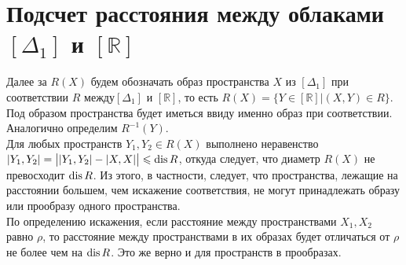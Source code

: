 
\section{Подсчет расстояния между облаками $[\Delta_1]$ и $[\mathbb{R}]$}
Далее за $R(X)$ будем обозначать образ пространства $X$ из $[\Delta_1]$ при соответствии $R$ между$[\Delta_1]$ и $[\mathbb{R}]$, то есть $R(X) = \{Y \in [\mathbb{R}] | (X, Y) \in R\}$. Под образом пространства будет иметься ввиду именно образ при соответствии.
 Аналогично определим $R^{-1}(Y)$. \\
 Для любых пространств $Y_1, Y_2 \in R(X)$ выполнено неравенство $|Y_1, Y_2| = \big| |Y_1,Y_2| - |X,X|\big| \leqslant \operatorname{dis} R$, откуда следует, что диаметр  $R(X)$ не превосходит $\operatorname{dis} R$. Из этого, в частности, следует, что пространства, лежащие на расстоянии большем, чем искажение соответствия, не могут принадлежать образу или прообразу одного пространства.\\
 По определению искажения, если расстояние между пространствами $X_1, X_2$ равно $\rho$, то расстояние между пространствами в их образах будет отличаться от $\rho$ не более чем на $\operatorname{dis} R$. Это же верно и для пространств в прообразах.

